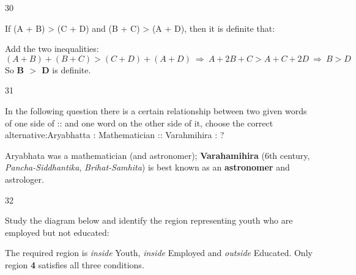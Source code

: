 \begin{question}{30}
{If (A + B) > (C + D) and (B + C) > (A + D), then it is definite that:\par}
\begin{explain}
Add the two inequalities:
\[(A+B)+(B+C)>(C+D)+(A+D)\ \Rightarrow\ A+2B+C>A+C+2D\ \Rightarrow\ B>D\]
So \textbf{B $>$ D} is definite.
\end{explain}
\end{question}

\begin{question}{31}
{In the following question there is a certain relationship between two given words of one side of :: and one word on the other side of it, choose the correct alternative:\newline Aryabhatta : Mathematician :: Varahmihira : ?\par}
\begin{explain}
Aryabhata was a mathematician (and astronomer); \textbf{Varahamihira} (6th century, \emph{Pancha-Siddhantika}, \emph{Brihat-Samhita}) is best known as an \textbf{astronomer} and astrologer.
\end{explain}
\end{question}

\begin{question}{32}
{Study the diagram below and identify the region representing youth who are employed but not educated:\par}
\begin{explain}
The required region is \emph{inside} Youth, \emph{inside} Employed and \emph{outside} Educated. Only region \textbf{4} satisfies all three conditions.
\end{explain}
\end{question}

